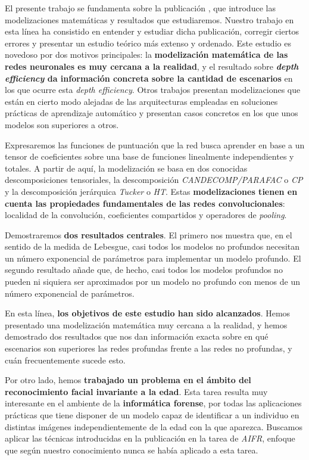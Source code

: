 El presente trabajo se fundamenta sobre la publicación \cite{matematicas:principal}, que introduce las modelizaciones matemáticas y resultados que estudiaremos. Nuestro trabajo en esta línea ha consistido en entender y estudiar dicha publicación, corregir ciertos errores y presentar un estudio teórico más extenso y ordenado. Este estudio es novedoso por dos motivos principales: la \textbf{modelización matemática de las redes neuronales es muy cercana a la realidad}, y el resultado sobre \textbf{\textit{depth efficiency} da información concreta sobre la cantidad de escenarios} en los que ocurre esta \textit{depth efficiency}. Otros trabajos presentan modelizaciones que están en cierto modo alejadas de las arquitecturas empleadas en soluciones prácticas de aprendizaje automático y presentan casos concretos en los que unos modelos son superiores a otros.

Expresaremos las funciones de puntuación que la red busca aprender en base a un tensor de coeficientes sobre una base de funciones linealmente independientes y totales. A partir de aquí, la modelización se basa en dos conocidas descomposiciones tensoriales, la descomposición \textit{CANDECOMP/PARAFAC} o \textit{CP} y la descomposición jerárquica \textit{Tucker} o \textit{HT}. Estas \textbf{modelizaciones tienen en cuenta las propiedades fundamentales de las redes convolucionales}: localidad de la convolución, coeficientes compartidos y operadores de \textit{pooling}.

Demostraremos \textbf{dos resultados centrales}. El primero nos muestra que, en el sentido de la medida de Lebesgue, casi todos los modelos no profundos necesitan un número exponencial de parámetros para implementar un modelo profundo. El segundo resultado añade que, de hecho, casi todos los modelos profundos no pueden ni siquiera ser aproximados por un modelo no profundo con menos de un número exponencial de parámetros.

En esta línea, \textbf{los objetivos de este estudio han sido alcanzados}. Hemos presentado una modelización matemática muy cercana a la realidad, y hemos demostrado dos resultados que nos dan información exacta sobre en qué escenarios son superiores las redes profundas frente a las redes no profundas, y cuán frecuentemente sucede esto.

Por otro lado, hemos \textbf{trabajado un problema en el ámbito del reconocimiento facial invariante a la edad}. Esta tarea resulta muy interesante en el ambiente de la \textbf{informática forense}, por todas las aplicaciones prácticas que tiene disponer de un modelo capaz de identificar a un individuo en distintas imágenes independientemente de la edad con la que aparezca. Buscamos aplicar las técnicas introducidas en la publicación \cite{informatica:principal} en la tarea de \textit{AIFR}, enfoque que según nuestro conocimiento nunca se había aplicado a esta tarea.


